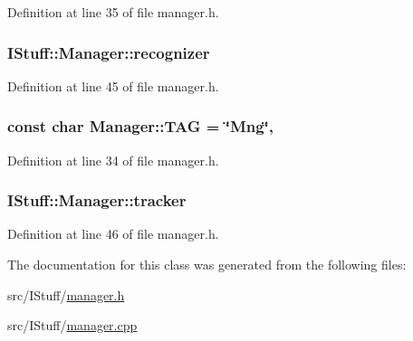 Definition at line 35 of file manager.\-h.

\hypertarget{class_i_stuff_1_1_manager_ac039aa2e611b04595e4ff69d3534b4cc}{
\subsubsection[{recognizer}]{ I\-Stuff\-::\-Manager\-::recognizer\hspace{0.3cm}{\ttfamily [private]}}}\label{class_i_stuff_1_1_manager_ac039aa2e611b04595e4ff69d3534b4cc}


Definition at line 45 of file manager.\-h.

\hypertarget{class_i_stuff_1_1_manager_a0228682f317a86ce7057b86e9d229ac6}{
\subsubsection[{T\-A\-G}]{\setlength{\rightskip}{0pt plus 5cm}const char Manager\-::\-T\-A\-G = \char`\"{}Mng\char`\"{}\hspace{0.3cm}{\ttfamily [static]}, {\ttfamily [private]}}}\label{class_i_stuff_1_1_manager_a0228682f317a86ce7057b86e9d229ac6}


Definition at line 34 of file manager.\-h.

\hypertarget{class_i_stuff_1_1_manager_a3d313f62a1cfe606098fdcb6f1c748ee}{
\subsubsection[{tracker}]{ I\-Stuff\-::\-Manager\-::tracker\hspace{0.3cm}{\ttfamily [private]}}}\label{class_i_stuff_1_1_manager_a3d313f62a1cfe606098fdcb6f1c748ee}


Definition at line 46 of file manager.\-h.



The documentation for this class was generated from the following files\-:\begin{DoxyCompactItemize}
\item 
src/\-I\-Stuff/\hyperlink{manager_8h}{manager.\-h}\item 
src/\-I\-Stuff/\hyperlink{manager_8cpp}{manager.\-cpp}\end{DoxyCompactItemize}
